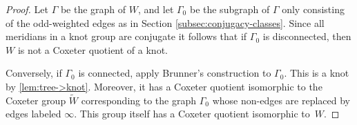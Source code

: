 \documentclass[main.tex]{subfiles}
\begin{document}
\begin{proof}
Let $\Gamma$ be the graph of $W$, and let $\Gamma_0$ be the subgraph of $\Gamma$ only consisting of the odd-weighted edges as in Section \ref{subsec:conjugacy-classes}. Since all meridians in a knot group are conjugate it follows that if $\Gamma_0$ is disconnected, then $W$ is not a Coxeter quotient of a knot.

Conversely, if $\Gamma_0$ is connected, apply Brunner's construction to $\Gamma_0$. This is a knot by \ref{lem:tree->knot}. Moreover, it has a Coxeter quotient isomorphic to the Coxeter group $\widetilde{W}$ corresponding to the graph $\Gamma_0$ whose non-edges are replaced by edges labeled $\infty$. This group itself has a Coxeter quotient isomorphic to~$W$.
\end{proof}
\end{document}
